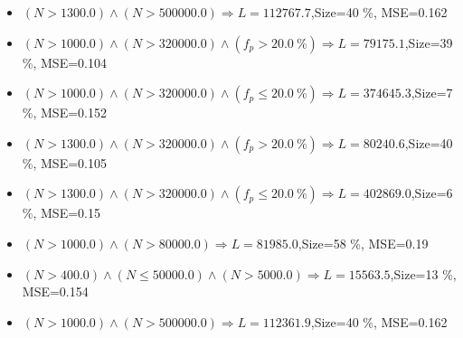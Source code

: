 \documentclass[numbered]{CSL}
\begin{document}
\begin{itemize}
\item $(N > 1300.0) \land (N > 500000.0) \Rightarrow L = 112767.7$,\hfill Size=40 \%, MSE=0.162
\item $(N > 1000.0) \land (N > 320000.0) \land (f_p > 20.0~\%) \Rightarrow L = 79175.1$,\hfill Size=39 \%, MSE=0.104
\item $(N > 1000.0) \land (N > 320000.0) \land (f_p \leq 20.0~\%) \Rightarrow L = 374645.3$,\hfill Size=7 \%, MSE=0.152
\item $(N > 1300.0) \land (N > 320000.0) \land (f_p > 20.0~\%) \Rightarrow L = 80240.6$,\hfill Size=40 \%, MSE=0.105
\item $(N > 1300.0) \land (N > 320000.0) \land (f_p \leq 20.0~\%) \Rightarrow L = 402869.0$,\hfill Size=6 \%, MSE=0.15
\item $(N > 1000.0) \land (N > 80000.0) \Rightarrow L = 81985.0$,\hfill Size=58 \%, MSE=0.19
\item $(N > 400.0) \land (N \leq 50000.0) \land (N > 5000.0) \Rightarrow L = 15563.5$,\hfill Size=13 \%, MSE=0.154
\item $(N > 1000.0) \land (N > 500000.0) \Rightarrow L = 112361.9$,\hfill Size=40 \%, MSE=0.162
\end{itemize}
\end{document}
